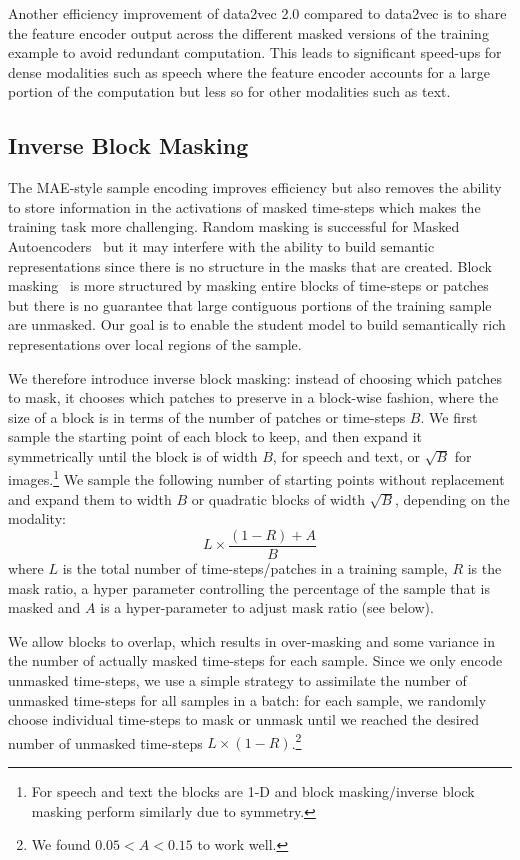 \documentclass[nohyperref]{article}
\theoremstyle{plain}
\theoremstyle{definition}
\theoremstyle{remark}
\newcommand{\name}{data2vec 2.0}
\begin{document}
Another efficiency improvement of \name{} compared to data2vec is to share the feature encoder output across the different masked versions of the training example to avoid redundant computation.
This leads to significant speed-ups for dense modalities such as speech where the feature encoder accounts for a large portion of the computation but less so for other modalities such as text.



\subsection{Inverse Block Masking}
\label{sec:masking}

The MAE-style sample encoding improves efficiency but also removes the ability to store information in the activations of masked time-steps which makes the training task more challenging.
Random masking is successful for Masked Autoencoders~\citep{he2021mae} but it may interfere with the ability to build semantic representations since there is no structure in the masks that are created.
Block masking~\citep{bao2021beit} is more structured by masking entire blocks of time-steps or patches but there is no guarantee that large contiguous portions of the training sample are unmasked.
Our goal is to enable the student model to build semantically rich representations over local regions of the sample.

\insertEfficiencyPlot

We therefore introduce inverse block masking: instead of choosing which patches to mask, it chooses which patches to preserve in a block-wise fashion, where the size of a block is in terms of the number of patches or time-steps $B$.
We first sample the starting point of each block to keep, and then expand it symmetrically until the block is of width $B$, for speech and text, or $\sqrt{B}$ for images.\footnote{For speech and text the blocks are 1-D and block masking/inverse block masking perform similarly due to symmetry.}
We sample the following number of starting points without replacement and expand them to width $B$ or quadratic blocks of width $\sqrt{B}$, depending on the modality: 
$$
L \times \frac{(1 - R) + A}{B}
$$
where $L$ is the total number of time-steps/patches in a training sample, $R$ is the mask ratio, a hyper parameter controlling the percentage of the sample that is masked and $A$ is a hyper-parameter to adjust mask ratio (see below).

We allow blocks to overlap, which results in over-masking and some variance in the number of actually masked time-steps for each sample.
Since we only encode unmasked time-steps, we use a simple strategy to assimilate the number of unmasked time-steps for all samples in a batch:
for each sample, we randomly choose individual time-steps to mask or unmask until we reached the desired number of unmasked time-steps $L \times (1 - R)$.\footnote{We found $0.05 < A < 0.15$ to work well.}
\end{document}
